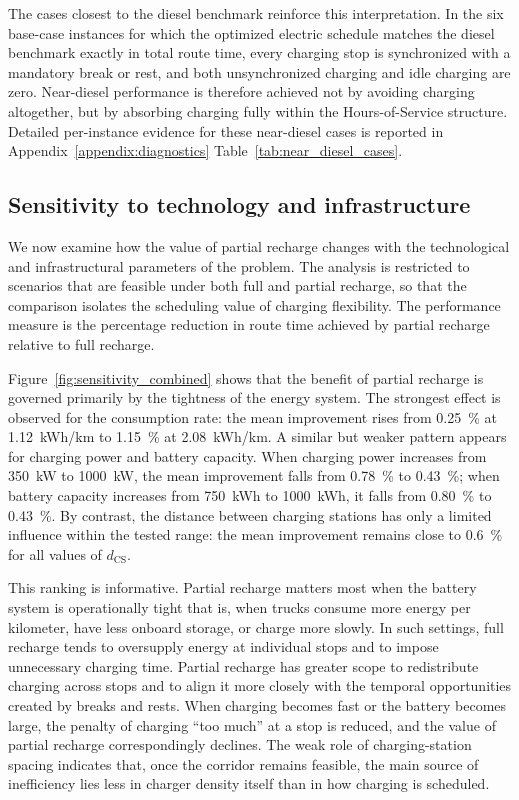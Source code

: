 \documentclass[3p,11pt,authoryear]{elsarticle}  %
\begin{document}
The cases closest to the diesel benchmark reinforce this interpretation. In the six base-case instances for which the optimized electric schedule matches the diesel benchmark exactly in total route time, every charging stop is synchronized with a mandatory break or rest, and both unsynchronized charging and idle charging are zero. Near-diesel performance is therefore achieved not by avoiding charging altogether, but by absorbing charging fully within the Hours-of-Service structure. Detailed per-instance evidence for these near-diesel cases is reported in Appendix~\ref{appendix:diagnostics} Table~\ref{tab:near_diesel_cases}.


\subsection{Sensitivity to technology and infrastructure}

We now examine how the value of partial recharge changes with the technological and infrastructural parameters of the problem. The analysis is restricted to scenarios that are feasible under both full and partial recharge, so that the comparison isolates the scheduling value of charging flexibility. The performance measure is the percentage reduction in route time achieved by partial recharge relative to full recharge.

Figure~\ref{fig:sensitivity_combined} shows that the benefit of partial recharge is governed primarily by the tightness of the energy system. The strongest effect is observed for the consumption rate: the mean improvement rises from \SI{0.25}{\percent} at \SI{1.12}{kWh/km} to \SI{1.15}{\percent} at \SI{2.08}{kWh/km}. A similar but weaker pattern appears for charging power and battery capacity. When charging power increases from \SI{350}{kW} to \SI{1000}{kW}, the mean improvement falls from \SI{0.78}{\percent} to \SI{0.43}{\percent}; when battery capacity increases from \SI{750}{kWh} to \SI{1000}{kWh}, it falls from \SI{0.80}{\percent} to \SI{0.43}{\percent}. By contrast, the distance between charging stations has only a limited influence within the tested range: the mean improvement remains close to \SI{0.6}{\percent} for all values of \(d_{\text{CS}}\).

This ranking is informative. Partial recharge matters most when the battery system is operationally tight that is, when trucks consume more energy per kilometer, have less onboard storage, or charge more slowly. In such settings, full recharge tends to oversupply energy at individual stops and to impose unnecessary charging time. Partial recharge has greater scope to redistribute charging across stops and to align it more closely with the temporal opportunities created by breaks and rests. When charging becomes fast or the battery becomes large, the penalty of charging ``too much'' at a stop is reduced, and the value of partial recharge correspondingly declines. The weak role of charging-station spacing indicates that, once the corridor remains feasible, the main source of inefficiency lies less in charger density itself than in how charging is scheduled.
\end{document}
